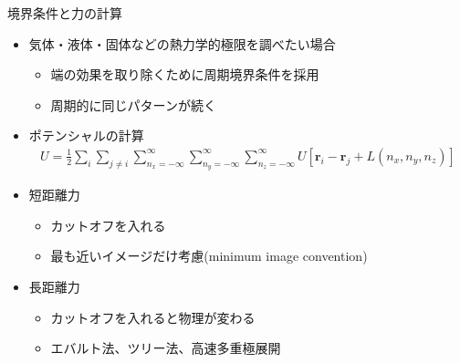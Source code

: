 
\begin{frame}[t,fragile]{境界条件と力の計算}
  \begin{itemize}
    \setlength{\itemsep}{1em}
  \item 気体・液体・固体などの熱力学的極限を調べたい場合
    \begin{itemize}
    \item 端の効果を取り除くために周期境界条件を採用
    \item 周期的に同じパターンが続く
    \end{itemize}
  \item ポテンシャルの計算
    \begin{align*}
      U = \frac{1}{2} \sum_i \sum_{j \ne i} \sum_{n_x=-\infty}^{\infty} \sum_{n_y=-\infty}^{\infty} \sum_{n_z=-\infty}^{\infty} U[\mathbf{r}_i - \mathbf{r}_j + L(n_x,n_y,n_z)]
    \end{align*}
  \item 短距離力
    \begin{itemize}
    \item カットオフを入れる
    \item 最も近いイメージだけ考慮(minimum image convention)
    \end{itemize}
  \item 長距離力
    \begin{itemize}
    \item カットオフを入れると物理が変わる
    \item エバルト法、ツリー法、高速多重極展開
    \end{itemize}
  \end{itemize}
\end{frame}
